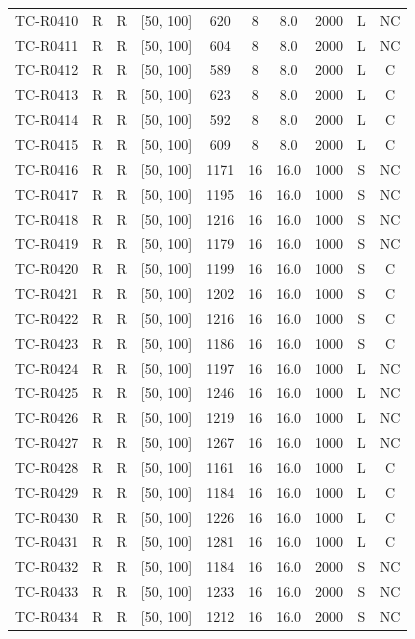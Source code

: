 \begin{longtable}{lccccccccc}
TC-R0410 & R & R & [50, 100] & 620 & 8 & 8.0 & 2000 & L & NC \\
TC-R0411 & R & R & [50, 100] & 604 & 8 & 8.0 & 2000 & L & NC \\
TC-R0412 & R & R & [50, 100] & 589 & 8 & 8.0 & 2000 & L & C \\
TC-R0413 & R & R & [50, 100] & 623 & 8 & 8.0 & 2000 & L & C \\
TC-R0414 & R & R & [50, 100] & 592 & 8 & 8.0 & 2000 & L & C \\
TC-R0415 & R & R & [50, 100] & 609 & 8 & 8.0 & 2000 & L & C \\
TC-R0416 & R & R & [50, 100] & 1171 & 16 & 16.0 & 1000 & S & NC \\
TC-R0417 & R & R & [50, 100] & 1195 & 16 & 16.0 & 1000 & S & NC \\
TC-R0418 & R & R & [50, 100] & 1216 & 16 & 16.0 & 1000 & S & NC \\
TC-R0419 & R & R & [50, 100] & 1179 & 16 & 16.0 & 1000 & S & NC \\
TC-R0420 & R & R & [50, 100] & 1199 & 16 & 16.0 & 1000 & S & C \\
TC-R0421 & R & R & [50, 100] & 1202 & 16 & 16.0 & 1000 & S & C \\
TC-R0422 & R & R & [50, 100] & 1216 & 16 & 16.0 & 1000 & S & C \\
TC-R0423 & R & R & [50, 100] & 1186 & 16 & 16.0 & 1000 & S & C \\
TC-R0424 & R & R & [50, 100] & 1197 & 16 & 16.0 & 1000 & L & NC \\
TC-R0425 & R & R & [50, 100] & 1246 & 16 & 16.0 & 1000 & L & NC \\
TC-R0426 & R & R & [50, 100] & 1219 & 16 & 16.0 & 1000 & L & NC \\
TC-R0427 & R & R & [50, 100] & 1267 & 16 & 16.0 & 1000 & L & NC \\
TC-R0428 & R & R & [50, 100] & 1161 & 16 & 16.0 & 1000 & L & C \\
TC-R0429 & R & R & [50, 100] & 1184 & 16 & 16.0 & 1000 & L & C \\
TC-R0430 & R & R & [50, 100] & 1226 & 16 & 16.0 & 1000 & L & C \\
TC-R0431 & R & R & [50, 100] & 1281 & 16 & 16.0 & 1000 & L & C \\
TC-R0432 & R & R & [50, 100] & 1184 & 16 & 16.0 & 2000 & S & NC \\
TC-R0433 & R & R & [50, 100] & 1233 & 16 & 16.0 & 2000 & S & NC \\
TC-R0434 & R & R & [50, 100] & 1212 & 16 & 16.0 & 2000 & S & NC \\

\end{longtable}
